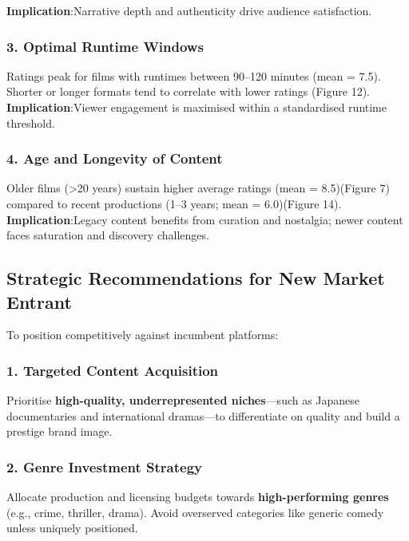 \documentclass[
  man,floatsintext]{apa6}
\begin{document}
\textbf{Implication}:Narrative depth and authenticity drive audience satisfaction.

\subsubsection{3. Optimal Runtime Windows}\label{optimal-runtime-windows}

Ratings peak for films with runtimes between 90--120 minutes (mean = 7.5). Shorter or longer formats tend to correlate with lower ratings (Figure 12).
\textbf{Implication}:Viewer engagement is maximised within a standardised runtime threshold.

\subsubsection{4. Age and Longevity of Content}\label{age-and-longevity-of-content}

Older films (\textgreater20 years) sustain higher average ratings (mean = 8.5)(Figure 7) compared to recent productions (1--3 years; mean = 6.0)(Figure 14).
\textbf{Implication}:Legacy content benefits from curation and nostalgia; newer content faces saturation and discovery challenges.

\subsection{Strategic Recommendations for New Market Entrant}\label{strategic-recommendations-for-new-market-entrant}

To position competitively against incumbent platforms:

\subsubsection{1. Targeted Content Acquisition}\label{targeted-content-acquisition}

Prioritise \textbf{high-quality, underrepresented niches}---such as Japanese documentaries and international dramas---to differentiate on quality and build a prestige brand image.

\subsubsection{2. Genre Investment Strategy}\label{genre-investment-strategy}

Allocate production and licensing budgets towards \textbf{high-performing genres} (e.g., crime, thriller, drama). Avoid overserved categories like generic comedy unless uniquely positioned.
\end{document}
